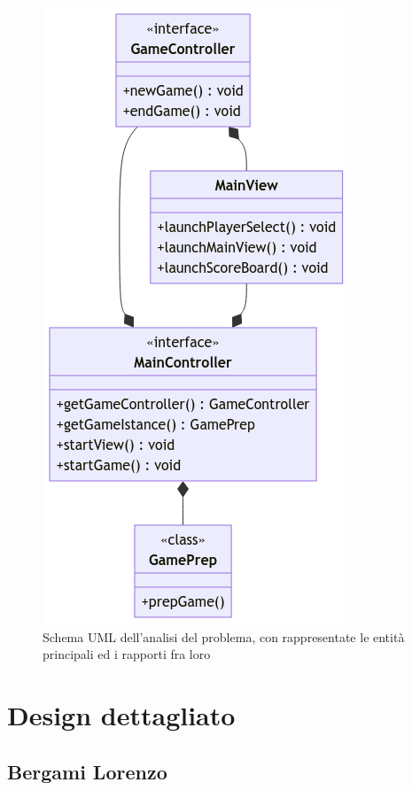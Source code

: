 \documentclass[a4paper,12pt]{report}
\begin{document}
\begin{figure}[H]
\centering{}
\includegraphics[scale=0.7]{UMLacrchitecture.png}
\caption{Schema UML dell'analisi del problema, con rappresentate le entità principali ed i rapporti fra loro}
\label{img:analysisGraph}
\end{figure}
\newpage


\section{Design dettagliato}
\subsection{Bergami Lorenzo}
\end{document}
